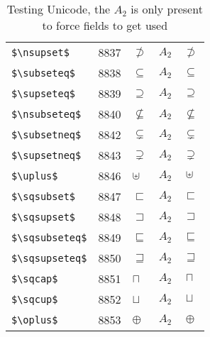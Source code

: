 \documentclass{article}
\begin{document}
\begin{table}
\begin{center}
\begin{tabular}{llll}
 \verb#$\nsupset$#     & 8837    & $\nsupset$     & $A_2\quad \nsupset$\\
 \verb#$\subseteq$#    & 8838    & $\subseteq$    & $A_2\quad \subseteq$\\
 \verb#$\supseteq$#    & 8839    & $\supseteq$    & $A_2\quad \supseteq$\\
 \verb#$\nsubseteq$#   & 8840    & $\nsubseteq$   & $A_2\quad \nsubseteq$\\
 \verb#$\subsetneq$#   & 8842    & $\subsetneq$   & $A_2\quad \subsetneq$\\
 \verb#$\supsetneq$#   & 8843    & $\supsetneq$   & $A_2\quad \supsetneq$\\
 \verb#$\uplus$#       & 8846    & $\uplus$       & $A_2\quad \uplus$\\
 \verb#$\sqsubset$#    & 8847    & $\sqsubset$    & $A_2\quad \sqsubset$\\
 \verb#$\sqsupset$#    & 8848    & $\sqsupset$    & $A_2\quad \sqsupset$\\
 \verb#$\sqsubseteq$#  & 8849    & $\sqsubseteq$  & $A_2\quad \sqsubseteq$\\
 \verb#$\sqsupseteq$#  & 8850    & $\sqsupseteq$  & $A_2\quad \sqsupseteq$\\
 \verb#$\sqcap$#       & 8851    & $\sqcap$       & $A_2\quad \sqcap$\\
 \verb#$\sqcup$#       & 8852    & $\sqcup$       & $A_2\quad \sqcup$\\
 \verb#$\oplus$#       & 8853    & $\oplus$       & $A_2\quad \oplus$\\
\end{tabular}
\end{center}
\caption{Testing Unicode, the $A_2$ is only present to force fields to get used}
\end{table}
\clearpage
\end{document}

